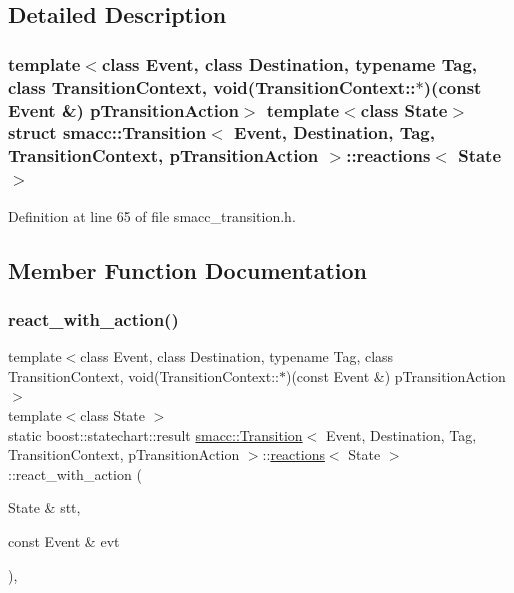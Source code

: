 \subsection{Detailed Description}
\subsubsection*{template$<$class Event, class Destination, typename Tag, class Transition\+Context, void(\+Transition\+Context\+::$\ast$)(const Event \&) p\+Transition\+Action$>$\newline
template$<$class State$>$\newline
struct smacc\+::\+Transition$<$ Event, Destination, Tag, Transition\+Context, p\+Transition\+Action $>$\+::reactions$<$ State $>$}



Definition at line 65 of file smacc\+\_\+transition.\+h.



\subsection{Member Function Documentation}
\mbox{\label{structsmacc_1_1Transition_1_1reactions_a843ddc3d10e2aec66a702745852455c3}} 
\subsubsection{\texorpdfstring{react\+\_\+with\+\_\+action()}{react\_with\_action()}}
{\footnotesize\ttfamily template$<$class Event, class Destination, typename Tag, class Transition\+Context, void(\+Transition\+Context\+::$\ast$)(const Event \&) p\+Transition\+Action$>$ \\
template$<$class State $>$ \\
static boost\+::statechart\+::result \hyperlink{classsmacc_1_1Transition}{smacc\+::\+Transition}$<$ Event, Destination, Tag, Transition\+Context, p\+Transition\+Action $>$\+::\hyperlink{structsmacc_1_1Transition_1_1reactions}{reactions}$<$ State $>$\+::react\+\_\+with\+\_\+action (\begin{DoxyParamCaption}\item[{State \&}]{stt,  }\item[{const Event \&}]{evt }\end{DoxyParamCaption})\hspace{0.3cm}{\ttfamily [inline]}, {\ttfamily [static]}}



